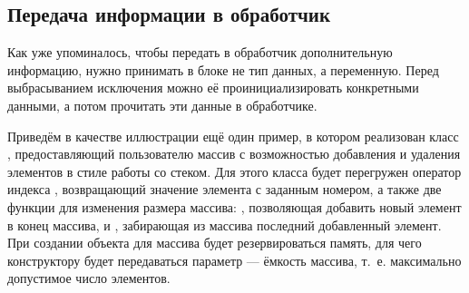 \subsection[Передача информации в обработчик]{Передача информации в обработчик}\label{ch10:4.2}
Как уже упоминалось, чтобы  передать в обработчик дополнительную информацию, нужно
принимать в блоке  не тип данных, а переменную. Перед выбрасыванием исключения можно её
проинициализировать конкретными данными, а потом прочитать эти данные в обработчике. 

Приведём в качестве иллюстрации ещё один пример, в котором реализован класс , предоставляющий
пользователю массив с возможностью добавления и удаления элементов в стиле работы со стеком. Для этого класса будет
перегружен оператор индекса \Sys{[]}, возвращающий значение элемента с заданным номером, а также две
функции для изменения размера массива: , позволяющая добавить новый элемент в конец
массива, и , забирающая из массива последний добавленный элемент. При создании объекта для
массива будет резервироваться память, для чего конструктору будет передаваться параметр  
--- ёмкость массива, т.~е. максимально допустимое число элементов. 
